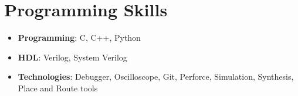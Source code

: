 \documentclass[letterpaper,11pt]{article}
\newcommand{\resumeItem}[2]{
  \item\small{
    \textbf{#1}{: #2 \vspace{-2pt}}
  }
}
\newcommand{\resumeSubItem}[2]{\resumeItem{#1}{#2}\vspace{-4pt}}
\newcommand{\resumeSubHeadingListStart}{\begin{itemize}[leftmargin=*]}
\newcommand{\resumeSubHeadingListEnd}{\end{itemize}}
\begin{document}
%
\section{Programming Skills}
  \resumeSubHeadingListStart
    \resumeSubItem{Programming}
    {C, C++, Python}
    \resumeSubItem{HDL}
    {Verilog, System Verilog}
    \resumeSubItem{Technologies}
    {Debugger, Oscilloscope, Git, Perforce, Simulation, Synthesis, Place and Route tools}
  \resumeSubHeadingListEnd


\end{document}
